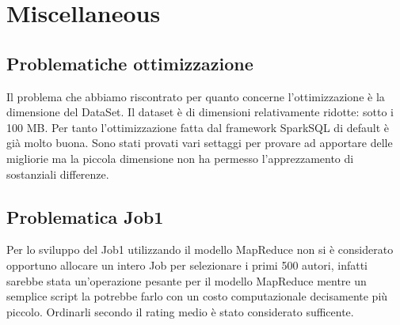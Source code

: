 
\section{Miscellaneous}

\subsection{Problematiche ottimizzazione}

Il problema che abbiamo riscontrato per quanto concerne l'ottimizzazione è la dimensione del DataSet.
Il dataset è di dimensioni relativamente ridotte: sotto i 100 MB. Per tanto l'ottimizzazione fatta dal
framework SparkSQL di default è già molto buona. Sono stati provati vari settaggi per provare ad apportare delle migliorie
ma la piccola dimensione non ha permesso l'apprezzamento di sostanziali differenze.

\subsection{Problematica Job1}

Per lo sviluppo del Job1 utilizzando il modello MapReduce non si è considerato opportuno allocare un intero Job per
selezionare i primi 500 autori, infatti sarebbe stata un'operazione pesante per il modello MapReduce mentre un semplice script
la potrebbe farlo con un costo computazionale decisamente più piccolo. Ordinarli secondo il rating medio è stato considerato sufficente.

